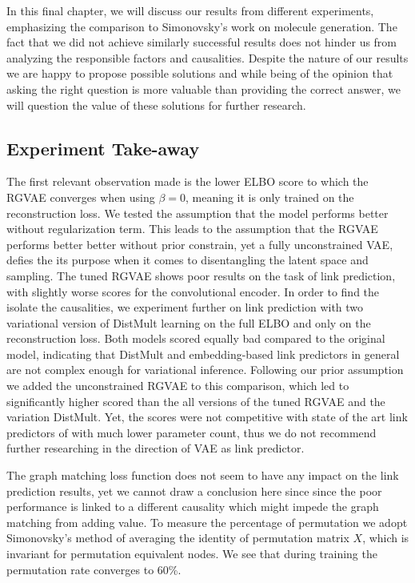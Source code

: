 

In this final chapter, we will discuss our results from different experiments, emphasizing the comparison to Simonovsky's work on molecule generation. The fact that we did not achieve similarly successful results does not hinder us from analyzing the responsible factors and causalities. Despite the nature of our results we are happy to propose possible solutions and while being of the opinion that asking the right question is more valuable than providing the correct answer, we will question the value of these solutions for further research.

\subsection{Experiment Take-away}


The first relevant observation made is the lower ELBO score to which the RGVAE converges when using $\beta=0$, meaning it is only trained on the reconstruction loss.
We tested the assumption that the model performs better without regularization term. This leads to the assumption that the RGVAE performs better better without prior constrain, yet a fully unconstrained VAE, defies the its purpose when it comes to disentangling the latent space and sampling.
The tuned RGVAE shows poor results on the task of link prediction, with slightly worse scores for the convolutional encoder. In order to find the isolate the causalities, we experiment further on link prediction with two variational version of DistMult learning on the full ELBO and only on the reconstruction loss. Both models scored equally bad compared to the original model, indicating that DistMult and embedding-based link predictors in general are not complex enough for variational inference. Following our prior assumption we added the unconstrained RGVAE to this comparison, which led to significantly higher scored than the all versions of the tuned RGVAE and the variation DistMult. Yet, the scores were not competitive with state of the art link predictors of with much lower parameter count, thus we do not recommend further researching in the direction of VAE as link predictor.

The graph matching loss function does not seem to have any impact on the link prediction results, yet we cannot draw a conclusion here since since the poor performance is linked to a different causality which might impede the graph matching from adding value. To measure the percentage of permutation we adopt Simonovsky's method of averaging the identity of permutation matrix $X$, which is invariant for permutation equivalent nodes. We see that during training the permutation rate converges to $60$\%.

